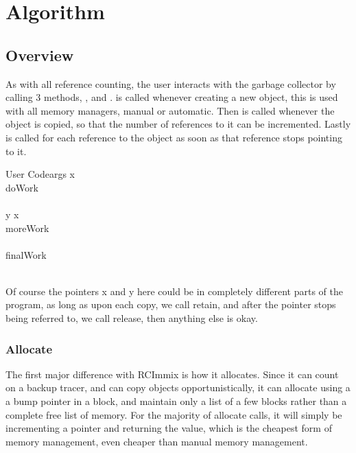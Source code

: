 \documentclass{article}
\begin{document}
\section{Algorithm}

\subsection{Overview}

As with all reference counting, the user interacts with the garbage collector by calling 3 methods, ,  and .  is called whenever creating a new object, this is used with all memory managers, manual or automatic. Then  is called whenever the object is copied, so that the number of references to it can be incremented. Lastly  is called for each reference to the object as soon as that reference stops pointing to it.

\begin{pseudocode}{User Code}{args}
\MAIN
	x \GETS {}\\
	doWork\\
	\\
	y \GETS x\\
	moreWork\\
	\\
	finalWork\\
	\\
\ENDMAIN
\end{pseudocode}

Of course the pointers x and y here could be in completely different parts of the program, as long as upon each copy, we call retain, and after the pointer stops being referred to, we call release, then anything else is okay.

\subsubsection{Allocate}

The first major difference with RCImmix is how it allocates. Since it can count on a backup tracer, and can copy objects opportunistically, it can allocate using a a bump pointer in a block, and maintain only a list of a few blocks rather than a complete free list of memory. For the majority of allocate calls, it will simply be incrementing a pointer and returning the value, which is the cheapest form of memory management, even cheaper than manual memory management.
\end{document}
